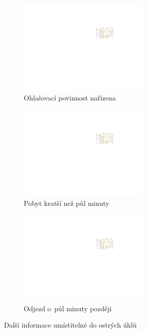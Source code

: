 \begin{figure}[ht]
    \centering
    \begin{subfigure}[b]{0.3\textwidth}
        \includegraphics[width=0.7\textwidth]{../img/koty_dalsi_set_x}
        \caption{Ohlašovací povinnost nařízena}
    \end{subfigure}
    \begin{subfigure}[b]{0.3\textwidth}
        \includegraphics[width=0.7\textwidth]{../img/koty_dalsi_set_y}
        \caption{Pobyt kratší než půl minuty}
    \end{subfigure}
    \begin{subfigure}[b]{0.3\textwidth}
        \includegraphics[width=0.7\textwidth]{../img/koty_dalsi_set_z}
        \caption{Odjezd o~půl minuty později}
    \end{subfigure}
    \caption{Další informace umístitelné do ostrých úhlů}
    \label{fig:uvod:koty_dalsi}    
\end{figure}

